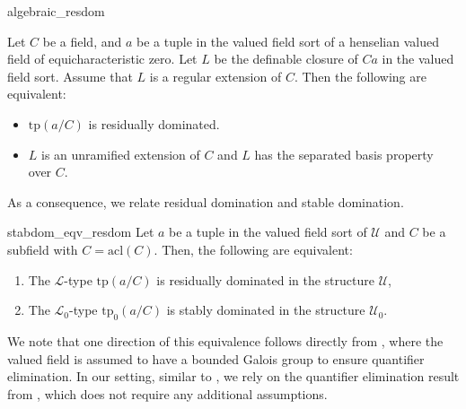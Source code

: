 \documentclass[12pt]{article}
\newcommand{\tpp}{\mathrm{tp}}
\newcommand{\acl}{\mathrm{acl}}
\newcommand{\0}{\emptyset}
\newcommand{\U}{\mathcal{U}}
\newcommand{\Ualg}{\mathcal{U}_0}
\theoremstyle{plain}%
\theoremstyle{definition}
\theoremstyle{remark}
\begin{document}
\begin{repcor}{algebraic_resdom}

 Let $C$ be a field, and $a$ be a tuple in the valued field sort of a henselian valued field of equicharacteristic zero. Let $L$ be the definable closure of $Ca$ in the valued field sort. Assume that $L$ is a regular extension of $C$. Then the following are equivalent:

\begin{itemize}
\item[(i)] $\tpp(a/C)$ is residually dominated.
\item[(ii)] $L$ is an unramified extension of $C$ and $L$ has the separated basis property over $C$. 
\end{itemize}
\end{repcor}
As a consequence, we relate residual domination and stable domination. 

\begin{repthm}{stabdom_eqv_resdom}
    Let $a$ be a tuple in the valued field sort of $\U$ and $C$ be a subfield with $C=\acl(C)$. Then, the following are equivalent:
\begin{enumerate}
    \item The $\mathcal{L}$-type $\tpp(a/C)$ is residually dominated in the structure $\U$,
    \item The $\mathcal{L}_0$-type $\tpp_0(a/C)$ is stably dominated in the structure $\Ualg$.
\end{enumerate}
 
\end{repthm}

We note that one direction of this equivalence follows directly from \cite[Theorem 4.6]{EHS23}, where the valued field is assumed to have a bounded Galois group to ensure quantifier elimination. In our setting, similar to \cite{Vic22}, we rely on the quantifier elimination result from \cite{ACG22}, which does not require any additional assumptions. 

\end{document}
